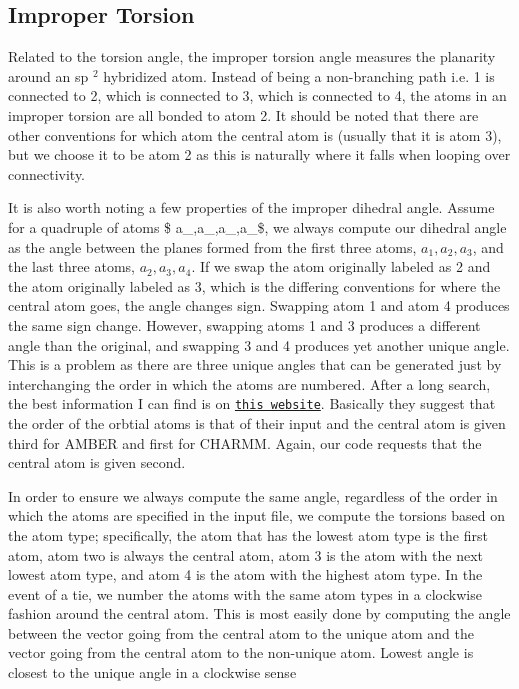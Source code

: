 \subsection*{Improper Torsion}

Related to the torsion angle, the improper torsion angle measures the planarity around an sp $^2$ hybridized atom. Instead of being a non-\/branching path i.\+e. 1 is connected to 2, which is connected to 3, which is connected to 4, the atoms in an improper torsion are all bonded to atom 2. It should be noted that there are other conventions for which atom the central atom is (usually that it is atom 3), but we choose it to be atom 2 as this is naturally where it falls when looping over connectivity.

It is also worth noting a few properties of the improper dihedral angle. Assume for a quadruple of atoms \$ a\+\_,a\+\_,a\+\_,a\+\_\$, we always compute our dihedral angle as the angle between the planes formed from the first three atoms, $a_1, a_2, a_3$, and the last three atoms, $a_2, a_3, a_4$. If we swap the atom originally labeled as 2 and the atom originally labeled as 3, which is the differing conventions for where the central atom goes, the angle changes sign. Swapping atom 1 and atom 4 produces the same sign change. However, swapping atoms 1 and 3 produces a different angle than the original, and swapping 3 and 4 produces yet another unique angle. This is a problem as there are three unique angles that can be generated just by interchanging the order in which the atoms are numbered. After a long search, the best information I can find is on \href{http://chempedia.info/info/165388/}{\tt this website}. Basically they suggest that the order of the orbtial atoms is that of their input and the central atom is given third for A\+M\+B\+ER and first for C\+H\+A\+R\+MM. Again, our code requests that the central atom is given second.

In order to ensure we always compute the same angle, regardless of the order in which the atoms are specified in the input file, we compute the torsions based on the atom type; specifically, the atom that has the lowest atom type is the first atom, atom two is always the central atom, atom 3 is the atom with the next lowest atom type, and atom 4 is the atom with the highest atom type. In the event of a tie, we number the atoms with the same atom types in a clockwise fashion around the central atom. This is most easily done by computing the angle between the vector going from the central atom to the unique atom and the vector going from the central atom to the non-\/unique atom. Lowest angle is closest to the unique angle in a clockwise sense 